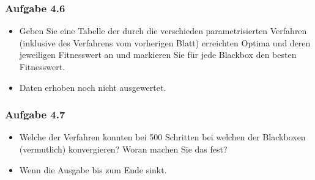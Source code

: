 \documentclass[xcolor=pdftex,dvipsnames,table]{beamer}
\begin{document}
\begin{frame}
  \frametitle{Aufgabe 4.6}
  \begin{itemize}
  		\item Geben Sie eine Tabelle der durch die verschieden parametrisierten Verfahren (inklusive des
Verfahrens vom vorherigen Blatt) erreichten Optima und deren jeweiligen Fitnesswert an und
markieren Sie für jede Blackbox den besten Fitnesswert.

\item Daten erhoben noch nicht ausgewertet.

  \end{itemize}
    
\end{frame}

\begin{frame}
  \frametitle{Aufgabe 4.7}
  \begin{itemize}
  		\item Welche der Verfahren konnten bei 500 Schritten bei welchen der Blackboxen (vermutlich) konvergieren?
Woran machen Sie das fest?

\item Wenn die Ausgabe bis zum Ende sinkt.
  \end{itemize}
\end{frame}
\end{document}
